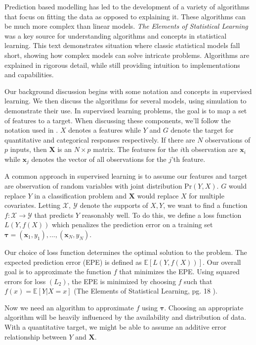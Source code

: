 \documentclass[
  12pt,
  letterpaper,
  DIV=11,
  numbers=noendperiod]{scrartcl}
\newcommand{\bm}{\mathbf}
\begin{document}
Prediction based modelling has led to the development of a variety of
algorithms that focus on fitting the data as opposed to explaining it.
These algorithms can be much more complex than linear models. \emph{The
Elements of Statistical Learning} \citep{esl} was a key source for
understanding algorithms and concepts in statistical learning. This text
demonstrates situation where classic statistical models fall short,
showing how complex models can solve intricate problems. Algorithms are
explained in rigorous detail, while still providing intuition to
implementations and capabilities.

Our background discussion begins with some notation and concepts in
supervised learning. We then discuss the algorithms for several models,
using simulation to demonstrate their use. In supervised learning
problems, the goal is to map a set of features to a target. When
discussing these components, we'll follow the notation used in
\citep{esl}. \(X\) denotes a features while \(Y\) and \(G\) denote the
target for quantitative and categorical responses respectively. If there
are \(N\) observations of \(p\) inputs, then \(\bm X\) is an
\(N\times p\) matrix. The features for the \(i\)th observation are
\(\bm x_i\) while \(\bm x_j\) denotes the vector of all observations for
the \(j\)'th feature.

A common approach in supervised learning is to assume our features and
target are observation of random variables with joint distribution
\(\text{Pr}(Y,X)\). \(G\) would replace \(Y\) in a classification
problem and \(\bm X\) would replace \(X\) for multiple covariates.
Letting \(\mathcal{X,\ Y}\) denote the supports of \(X, Y\), we want to
find a function \(f:\mathcal{X}\rightarrow\mathcal{Y}\) that predicts
\(Y\) reasonably well. To do this, we define a loss function
\(L(Y,f(X))\) which penalizes the prediction error on a training set
\(\boldsymbol \tau=(\bm x_1,y_1),...,(\bm x_N,y_N)\).

Our choice of loss function determines the optimal solution to the
problem. The expected prediction error (EPE) is defined as
\(\mathbb{E}[L(Y,f(X))]\). Our overall goal is to approximate the
function \(f\) that minimizes the EPE. Using squared errors for loss
\((L_2)\), the EPE is minimized by choosing \(f\) such that
\(f(x)=\mathbb{E}[Y|X=x]\) (The Elements of Statistical Learning, pg. 18
\citep{esl}).

Now we need an algorithm to approximate \(f\) using
\(\boldsymbol \tau\). Choosing an appropriate algorithm will be heavily
influenced by the availability and distribution of data. With a
quantitative target, we might be able to assume an additive error
relationship between \(Y\) and \(\bm X\).
\end{document}
